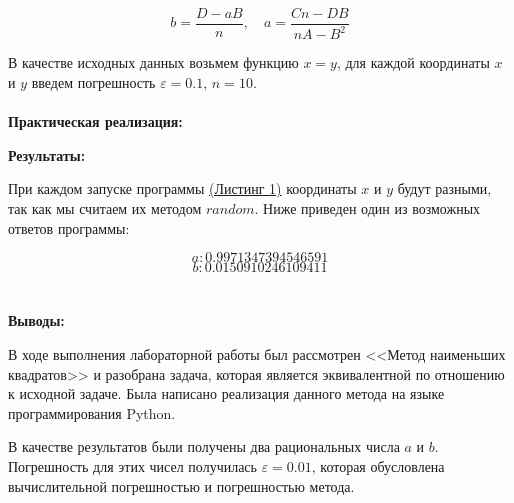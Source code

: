 \documentclass[a4paper, 12pt]{article}   	%
\begin{document}
\begin{equation}\label{eq:8}
b = \frac {D-aB}{n}, \quad
a = \frac {Cn-DB}{nA-B^2}
\end{equation}

В качестве исходных данных возьмем функцию $x = y$, для каждой координаты $x$  и $y$ введем погрешность $\varepsilon = 0.1$, $n = 10$.
\\\\

\textbf{Практическая реализация:}
\hypertarget{lst:quad}{}



\textbf{Результаты:}

При каждом запуске программы \hyperlink{lst:quad}{(Листинг 1)} координаты $x$ и $y$ будут разными, так как мы считаем их методом $random$. Ниже приведен один из возможных ответов программы:

\begin{equation*}
a: 0.9971347394546591
 \end{equation*}
\begin{equation*}
b: 0.0150910246109411
\end{equation*}
\\\\

\textbf{Выводы:}

В ходе выполнения лабораторной работы был рассмотрен <<Метод наименьших квадратов>> и разобрана задача, которая является эквивалентной по отношению к исходной задаче. Была написано реализация данного метода на языке программирования Python.

В качестве результатов были получены два рациональных числа $a$ и $b$. Погрешность для этих чисел получилась $\varepsilon = 0.01$, которая обусловлена вычислительной погрешностью и погрешностью метода.


 
 
 
 
 
 
 \enddocument
 
 
\end{document}
